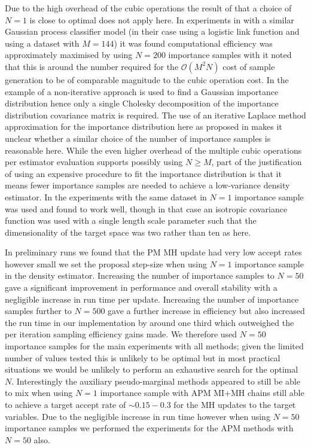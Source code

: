 Due to the high overhead of the cubic operations the result of \citep{sherlock2016pseudo} that a choice of $N=1$ is close to optimal does not apply here. In experiments in \citep{sherlock2016pseudo} with a similar Gaussian process classifier model (in their case using a logistic link function and using a dataset with $M=144$) it was found computational efficiency was approximately maximised by using $N=200$ importance samples with it noted that this is around the number required for the $\mathcal{O}(M^2 N)$ cost of sample generation to be of comparable magnitude to the cubic operation cost. In the example of \citep{sherlock2016pseudo} a non-iterative approach is used to find a Gaussian importance distribution hence only a single Cholesky decomposition of the importance distribution covariance matrix is required. The use of an iterative Laplace method approximation for the importance distribution here as proposed in \citep{filippone2014pseudo} makes it unclear whether a similar choice of the number of importance samples is reasonable here. While the even higher overhead of the multiple cubic operations per estimator evaluation supports possibly using $N \geq M$, part of the justification of using an expensive procedure to fit the importance distribution is that it means fewer importance samples are needed to achieve a low-variance density estimator. In the experiments with the same dataset in \citep{filippone2014pseudo} $N=1$ importance sample was used and found to work well, though in that case an isotropic covariance function was used with a single length scale parameter such that the dimensionality of the target space was two rather than ten as here.

In preliminary runs we found that the \ac{PM} \ac{MH} update had very low accept rates however small we set the proposal step-size when using $N=1$ importance sample in the density estimator. Increasing the number of importance samples to $N=50$ gave a significant improvement in performance and overall stability with a negligible increase in run time per update. Increasing the number of importance samples further to $N=500$ gave a further increase in efficiency but also increased the run time in our implementation by around one third which outweighed the per iteration sampling efficiency gains made. We therefore used $N=50$ importance samples for the main experiments with all methods; given the limited number of values tested this is unlikely to be optimal but in most practical situations we would be unlikely to perform an exhaustive search for the optimal $N$. Interestingly the auxiliary pseudo-marginal methods appeared to still be able to mix when using $N=1$ importance sample with \ac{APM} \ac{MI}+\ac{MH} chains still able to achieve a target accept rate of $\sim 0.15-0.3$ for the \ac{MH} updates to the target variables. Due to the negligible increase in run time however when using $N=50$ importance samples we performed the experiments for the \ac{APM} methods with $N=50$ also.

